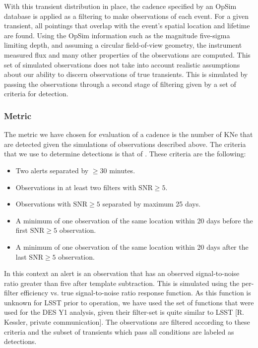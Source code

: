 With this transient distribution in place, the cadence specified by an OpSim database is applied as a filtering to make observations of each event. For a given transient, all pointings that overlap with the event's spatial location and lifetime are found. Using the OpSim information such as the magnitude five-sigma limiting depth, and assuming a circular field-of-view geometry, the instrument measured flux and many other properties of the observations are computed. This set of simulated observations does not take into account realistic assumptions about our ability to discern observations of true transients. This is simulated by passing the observations through a second stage of filtering given by a set of criteria for detection.

\subsubsection{Metric}
The metric we have chosen for evaluation of a cadence is the number of KNe that are detected given the simulations of observations described above. The criteria that we use to determine detections is that of \citet{Scolnic2017a}. These criteria are the following:
\begin{itemize}
  \item Two alerts separated by $\geq 30$ minutes.
  \item Observations in at least two filters with $\mathrm{SNR} \geq 5$.
  \item Observations with $\mathrm{SNR} \geq 5$ separated by maximum 25 days.
  \item A minimum of one observation of the same location within 20 days before the first $\mathrm{SNR} \geq 5$ observation.
  \item A minimum of one observation of the same location within 20 days after the last $\mathrm{SNR} \geq 5$ observation.
\end{itemize}

In this context an alert is an observation that has an observed signal-to-noise ratio greater than five after template subtraction. This is simulated using the per-filter efficiency vs. true signal-to-noise ratio response function. As this function is unknown for LSST prior to operation, we have used the set of functions that were used for the DES Y1 analysis, given their filter-set is quite similar to LSST [R. Kessler, private communication]. The observations are filtered according to these criteria and the subset of transients which pass all conditions are labeled as detections.

